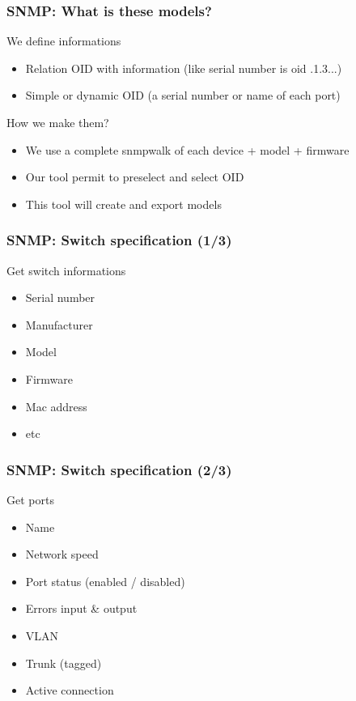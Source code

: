 \documentclass{beamer}
\begin{document}
\begin{frame}
    \frametitle{SNMP: What is these models?}

    \begin{block}{We define informations}
    \begin{itemize}
    \item Relation OID with information (like serial number is oid .1.3...)
    \item Simple or dynamic OID (a serial number or name of each port)
    \end{itemize}
    \end{block}

    \begin{block}{How we make them?}
    \begin{itemize}
    \item We use a complete snmpwalk of each device + model + firmware
    \item Our tool permit to preselect and select OID 
    \item This tool will create and export models 
    \end{itemize}
    \end{block}
\end{frame}

\begin{frame}
    \frametitle{SNMP: Switch specification (1/3)}

    \begin{block}{Get switch informations}
    \begin{itemize}
    \item Serial number
    \item Manufacturer
    \item Model
    \item Firmware
    \item Mac address    
    \item etc
    \end{itemize}
    \end{block}
\end{frame}

\begin{frame}
    \frametitle{SNMP: Switch specification (2/3)}

    \begin{block}{Get ports}
    \begin{itemize}
    \item Name
    \item Network speed
    \item Port status (enabled / disabled)
    \item Errors input \& output
    \item VLAN
    \item Trunk (tagged)
    \item Active connection
    \end{itemize}
    \end{block}
\end{frame}
\end{document}
